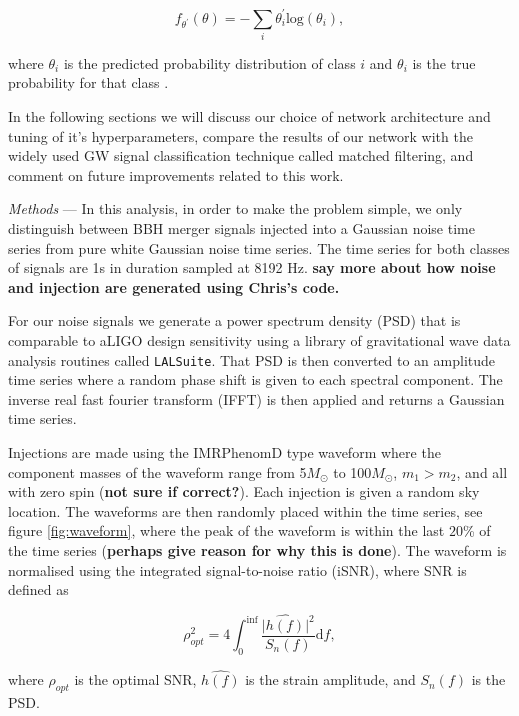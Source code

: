\documentclass[%
 amsmath,amssymb,
 aps,
 twocolumn,
 prl,
 reprint,
floatfix,
]{revtex4-1}
\begin{document}
\begin{equation} \label{eq:loss}
f_{\theta^{'}}(\theta) = -\sum_{i} \theta_{i}^{'} \mathrm{log}(\theta_{i}),
\end{equation}

where $\theta_{i}$ is the predicted probability distribution of class $i$ and $\theta_{i}$ is the true probability for that class \cite{tensorflow2015-whitepaper}. 

In the following sections we will discuss our choice of network architecture and tuning of it's hyperparameters, compare the results of our network with the widely used GW signal classification technique called matched filtering, and comment on future improvements related to this work.      

\textit{Methods} --- In this analysis, in order to make the problem simple, we only distinguish between BBH merger signals injected into a Gaussian noise time series from pure white Gaussian noise time series. The time series for both classes of signals are 1s in duration sampled at 8192 Hz. \textbf{say more about how noise and injection are generated using Chris's code.} 

For our noise signals we generate a power spectrum density (PSD) that is comparable to aLIGO design sensitivity using a library of gravitational wave data analysis routines called \texttt{LALSuite}. That PSD is then converted to an amplitude time series where a random phase shift is given to each spectral component. The inverse real fast fourier transform (IFFT) is then applied and returns a Gaussian time series.

Injections are made using the IMRPhenomD type waveform \cite{PhysRevD.93.044006, PhysRevD.93.044007} where the component masses of the waveform range from 5\(M_\odot\) to 100\(M_\odot\), $m_{1} > m_{2}$, and all with zero spin (\textbf{not sure if correct?}). Each injection is given a random sky location. The waveforms are then randomly placed within the time series, see figure \ref{fig:waveform}, where the peak of the waveform is within the last $20$\% of the time series (\textbf{perhaps give reason for why this is done}). The waveform is normalised using the integrated signal-to-noise ratio (iSNR), where SNR is defined as

\begin{equation} \label{eq:snr}
\rho_{opt}^{2} = 4 \int_{0}^{\inf} \frac{\lvert \hat{h(f)}\rvert^{2}}{S_{n}(f)} \mathrm{d}f,
\end{equation}

where $\rho_{opt}$ is the optimal SNR, $\hat{h(f)}$ is the strain amplitude, and $S_{n}(f)$ is the PSD.
\end{document}
